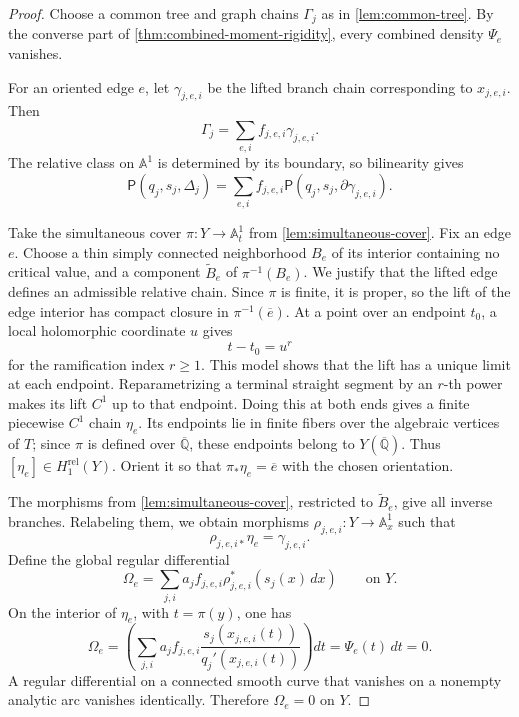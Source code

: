 \documentclass[11pt]{article}
\numberwithin{equation}{section}
\theoremstyle{definition}
\theoremstyle{remark}
\newcommand{\Qbar}{\overline{\mathbb Q}}
\newcommand{\Aone}{\mathbb A^1}
\begin{document}
\begin{proof}
Choose a common tree and graph chains $\Gamma_j$ as in
\cref{lem:common-tree}.  By the converse part of
\cref{thm:combined-moment-rigidity}, every combined density $\Psi_e$
vanishes.

For an oriented edge $e$, let $\gamma_{j,e,i}$ be the lifted branch chain
corresponding to $x_{j,e,i}$.  Then
\[
  \Gamma_j=\sum_{e,i}f_{j,e,i}\gamma_{j,e,i}.
\]
The relative class on $\Aone$ is determined by its boundary, so bilinearity
gives
\begin{equation}\label{eq:edge-decomposition-formal}
  \mathsf P(q_j,s_j,\Delta_j)
  =\sum_{e,i}f_{j,e,i}
    \mathsf P(q_j,s_j,\partial\gamma_{j,e,i}).
\end{equation}

Take the simultaneous cover $\pi:Y\to\Aone_t$ from
\cref{lem:simultaneous-cover}.  Fix an edge $e$.  Choose a thin simply
connected neighborhood $B_e$ of its interior containing no critical value,
and a component $\widetilde B_e$ of $\pi^{-1}(B_e)$.  We justify that
the lifted edge defines an admissible relative chain.  Since $\pi$ is
finite, it is proper, so the lift of the edge interior has compact closure
in $\pi^{-1}(\overline e)$.  At a point over an endpoint $t_0$, a local
holomorphic coordinate $u$ gives
\[
  t-t_0=u^r
\]
for the ramification index $r\ge1$.  This model shows that the lift has a
unique limit at each endpoint.  Reparametrizing a terminal straight
segment by an $r$-th power makes its lift $C^1$ up to that endpoint.
Doing this at both ends gives a finite piecewise $C^1$ chain $\eta_e$.
Its endpoints lie in finite fibers over the algebraic vertices of $T$;
since $\pi$ is defined over $\Qbar$, these endpoints belong to
$Y(\Qbar)$.  Thus $[\eta_e]\in H_1^{\mathrm{rel}}(Y)$.  Orient it so
that $\pi_*\eta_e=\overline e$ with the chosen orientation.

The morphisms from \cref{lem:simultaneous-cover}, restricted to
$\widetilde B_e$, give all inverse branches.  Relabeling them, we obtain
morphisms $\rho_{j,e,i}:Y\to\Aone_x$ such that
\begin{equation}\label{eq:edge-pushforward}
  \rho_{j,e,i*}\eta_e=\gamma_{j,e,i}.
\end{equation}
Define the global regular differential
\begin{equation}\label{eq:Omega-e}
  \Omega_e
  =\sum_{j,i}a_jf_{j,e,i}
    \rho_{j,e,i}^*(s_j(x)\,dx)
  \qquad\text{on }Y.
\end{equation}
On the interior of $\eta_e$, with $t=\pi(y)$, one has
\[
  \Omega_e
  =\left(
      \sum_{j,i}a_jf_{j,e,i}
       \frac{s_j(x_{j,e,i}(t))}{q_j'(x_{j,e,i}(t))}
    \right)dt
  =\Psi_e(t)\,dt=0.
\]
A regular differential on a connected smooth curve that vanishes on a
nonempty analytic arc vanishes identically.  Therefore $\Omega_e=0$ on
$Y$.


\end{proof}
\end{document}
